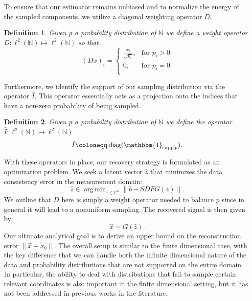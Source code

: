 \documentclass[a4paper,oneside]{amsart}
\newtheorem{definition}{Definition}[section]
\newcommand{\lnn}{\ell^2(\mathbb{N})}
\DeclareMathOperator*{\argmin}{arg\,min}
\DeclareMathOperator\supp{supp}
\DeclareMathOperator\diag{diag}
\begin{document}

To ensure that our estimator remains unbiased and to normalize the energy of the sampled components, we utilize a diagonal weighting operator $D$.

\begin{definition}
    Given $p$ a probability distribution of $\mathbb{N}$ we define a weight operator $D:\lnn \longmapsto \lnn$ so that
    \begin{equation*}
        (Dx)_i = \begin{cases} \frac{x_i}{\sqrt{p_i}}, & \text{for } p_i>0 \\ 0, & \text{for } p_i=0 \\ \end{cases}
    \end{equation*}
\end{definition}

Furthermore, we identify the support of our sampling distribution via the operator $\hat{I}$. This operator essentially acts as a projection onto the indices that have a non-zero probability of being sampled.

\begin{definition}
    Given $p$ a probability distribution of $\mathbb{N}$ we define the operator $\hat{I}:\lnn \longmapsto \lnn$
    \begin{equation*}
        \hat{I} \coloneqq \diag(\mathbbm{1}_{\supp p}).
    \end{equation*}
\end{definition}

With these operators in place, our recovery strategy is formulated as an optimization problem. We seek a latent vector $\hat{z}$ that minimizes the data consistency error in the measurement domain:
\begin{equation*}
    \hat{z} \in \argmin_{z \in {\mathbb{C}} ^{k}} \| b - SDF G(z) \|.
\end{equation*}
We outline that $D$ here is simply a weight operator needed to balance $p$ since in general it will lead to a nonuniform sampling. The recovered signal is then given by:
\begin{equation*}
    \hat{x} = G(\hat{z}).
\end{equation*}
Our ultimate analytical goal is to derive an upper bound on the reconstruction error $\| \hat{x} - x_0 \|$.
The overall setup is similar to the finite dimensional case, with the key difference that we can handle both the infinite dimensional nature of the data and probability distributions that are not supported on the entire domain.
In particular, the ability to deal with distributions that fail to sample certain relevant coordinates is also important in the finite dimensional setting, but it has not been addressed in previous works in the literature.
\end{document}
